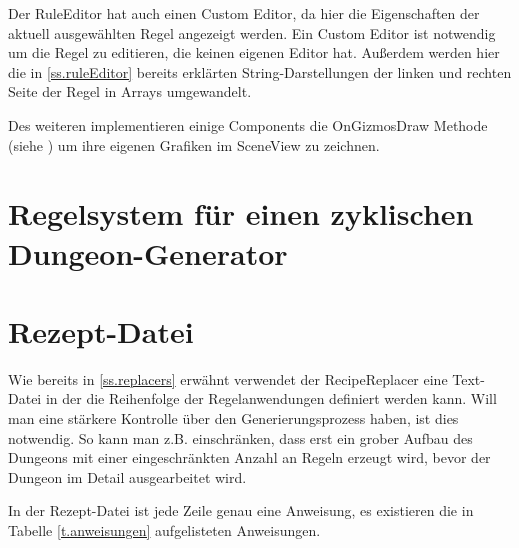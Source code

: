 Der RuleEditor hat auch einen Custom Editor, da hier die Eigenschaften der aktuell ausgewählten Regel angezeigt werden. Ein Custom Editor ist notwendig um die Regel zu editieren, die keinen eigenen Editor hat. Außerdem werden hier die in \ref{ss.ruleEditor} bereits erklärten String-Darstellungen der linken und rechten Seite der Regel in Arrays umgewandelt. 

Des weiteren implementieren einige Components die OnGizmosDraw Methode (siehe \cite[Seite: MonoBehaviour.OnDrawGizmos]{unitySciptingReference}) um ihre eigenen Grafiken im SceneView zu zeichnen. 


\section{Regelsystem für einen zyklischen Dungeon-Generator}\label{s.regelsystem}



\section{Rezept-Datei}\label{s.rezeptDatei}

Wie bereits in \ref{ss.replacers} erwähnt verwendet der RecipeReplacer eine Text-Datei in der die Reihenfolge der Regelanwendungen definiert werden kann. Will man eine stärkere Kontrolle über den Generierungsprozess haben, ist dies notwendig. So kann man z.B. einschränken, dass erst ein grober Aufbau des Dungeons mit einer eingeschränkten Anzahl an Regeln erzeugt wird, bevor der Dungeon im Detail ausgearbeitet wird.

In der Rezept-Datei ist jede Zeile genau eine Anweisung, es existieren die in Tabelle \ref{t.anweisungen} aufgelisteten Anweisungen.

